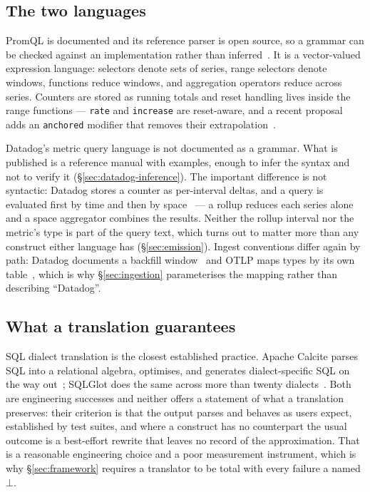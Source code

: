 \subsection{The two languages}

PromQL is documented and its reference parser is open source, so a grammar can be checked
against an implementation rather than inferred~\citep{promql}. It is a vector-valued
expression language: selectors denote sets of series, range selectors denote windows,
functions reduce windows, and aggregation operators reduce across series. Counters are
stored as running totals and reset handling lives inside the range functions ---
\texttt{rate} and \texttt{increase} are reset-aware, and a recent proposal adds an
\texttt{anchored} modifier that removes their extrapolation~\citep{prom0052}.

Datadog's metric query language is not documented as a grammar. What is published is a
reference manual with examples, enough to infer the syntax and not to verify it
(\S\ref{sec:datadog-inference}). The important difference is not syntactic: Datadog
stores a counter as per-interval deltas, and a query is evaluated first by time and then
by space~\citep{datadog,ddnested} --- a rollup reduces each series alone and a space
aggregator combines the results. Neither the rollup interval nor the metric's type is
part of the query text, which turns out to matter more than any construct either
language has (\S\ref{sec:emission}). Ingest conventions differ again by path: Datadog
documents a backfill window~\citep{ddhistorical} and OTLP maps types by its own
table~\citep{ddotlp}, which is why \S\ref{sec:ingestion} parameterises the mapping
rather than describing ``Datadog''.

\subsection{What a translation guarantees}

SQL dialect translation is the closest established practice. Apache Calcite parses SQL
into a relational algebra, optimises, and generates dialect-specific SQL on the way
out~\citep{begoli2018}; SQLGlot does the same across more than twenty
dialects~\citep{sqlglot}. Both are engineering successes and neither offers a statement
of what a translation preserves: their criterion is that the output parses and behaves as
users expect, established by test suites, and where a construct has no counterpart the
usual outcome is a best-effort rewrite that leaves no record of the approximation. That
is a reasonable engineering choice and a poor measurement instrument, which is why
\S\ref{sec:framework} requires a translator to be total with every failure a named
$\bot$.

